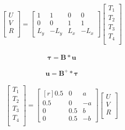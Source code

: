 \documentclass{report}
\begin{document}
	
	\begin{equation}
	\begin{aligned}
		\begin{bmatrix}
		U \\
		V \\
		R \\
		\end{bmatrix}
		=
		\begin{bmatrix}
		1   & 1 & 0 & 0\\
		0   & 0 & 1 & 1\\
		L_y & -L_y & L_x & -L_x
		\end{bmatrix}
		\begin{bmatrix}
		T_1 \\
		T_2 \\
		T_3 \\
		T_4 \\
		\end{bmatrix}
	\end{aligned}
	\end{equation}
	

	
	\begin{equation}
	\begin{aligned}
		\boldsymbol{\tau} = \boldsymbol{B} * \boldsymbol{u}
	\end{aligned}
	\end{equation}
	
	\begin{equation}
	\begin{aligned}
		\boldsymbol{u} = \boldsymbol{B^{+}} * \boldsymbol{\tau}
	\end{aligned}
	\end{equation}
	
	\begin{equation}
	\begin{aligned}
	\begin{bmatrix}
		T_1 \\
		T_2 \\
		T_3 \\
		T_4 \\
	\end{bmatrix}
	=
	\begin{bmatrix*}[r]
	0.5 &  0  &  a\\
	0.5 &  0  & -a\\
	0   & 0.5 &  b\\
	0   & 0.5 & -b
	\end{bmatrix*}
	\begin{bmatrix}
		U \\
		V \\
		R \\
	\end{bmatrix}
	\end{aligned}
	\end{equation}
	
	

	
	
	
	
		
	
	
	
		
\end{document}
